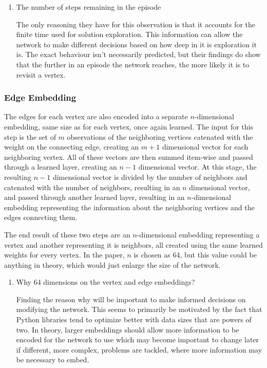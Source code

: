 \documentclass{article}
\begin{document}
\begin{enumerate}
    \item The number of steps remaining in the episode
    
    The only reasoning they have for this observation is that it accounts for the finite time used for solution exploration. This information can allow the network to make different decisions based on how deep in it is exploration it is. The exact behaviour isn't necessarily predicted, but their findings do show that the further in an episode the network reaches, the more likely it is to revisit a vertex. 

\end{enumerate}

\subsubsection{Edge Embedding}

The edges for each vertex are also encoded into a separate $n$-dimensional embedding, same size as for each vertex, once again learned. The input for this step is the set of $m$ observations of the neighboring vertices catenated with the weight on the connecting edge, creating an $m + 1$ dimensional vector for each neighboring vertex. All of these vectors are then summed item-wise and passed through a learned layer, creating an $n - 1$ dimensional vector. At this stage, the resulting $n - 1$ dimensional vector is divided by the number of neighbors and catenated with the number of neighbors, resulting in an $n$ dimensional vector, and passed through another learned layer, resulting in an $n$-dimensional embedding representing the information about the neighboring vertices and the edges connecting them.

The end result of these two steps are an $n$-dimensional embedding representing a vertex and another representing it is neighbors, all created using the same learned weights for every vertex. In the paper, $n$ is chosen as 64, but this value could be anything in theory, which would just enlarge the size of the network.


\begin{enumerate}
    \item Why 64 dimensions on the vertex and edge embeddings? 
    
    Finding the reason why will be important to make informed decisions on modifying the network. This seems to primarily be motivated by the fact that Python libraries tend to optimize better with data sizes that are powers of two. In theory, larger embeddings should allow more information to be encoded for the network to use which may become important to change later if different, more complex, problems are tackled, where more information may be necessary to embed. 
\end{enumerate}
\end{document}
